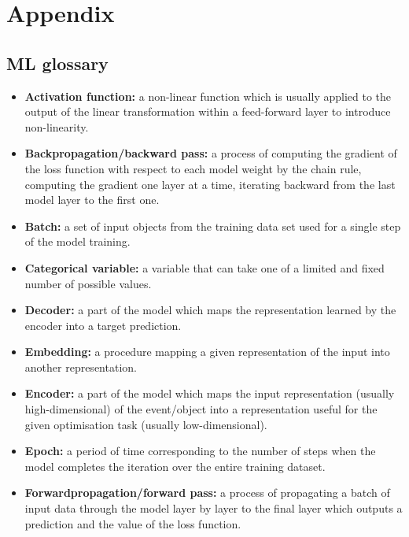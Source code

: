 \chapter{Appendix}

\section{ML glossary}\label{app:glossary}
\begin{itemize}
	
	\item[] \textbf{Activation function:} a non-linear function which is usually applied to the output of the linear transformation within a feed-forward layer to introduce non-linearity.   

	\item[] \textbf{Backpropagation/backward pass:} a process of computing the gradient of the loss function with respect to each model weight by the chain rule, computing the gradient one layer at a time, iterating backward from the last model layer to the first one. 

	\item[] \textbf{Batch:} a set of input objects from the training data set used for a single step of the model training.

	\item[] \textbf{Categorical variable:} a variable that can take one of a limited and fixed number of possible values.

	\item[] \textbf{Decoder:} a part of the model which maps the representation learned by the encoder into a target prediction. 

	\item[] \textbf{Embedding:} a procedure mapping a given representation of the input into another representation. 
	
	\item[] \textbf{Encoder:} a part of the model which maps the input representation (usually high-dimensional) of the event/object into a representation useful for the given optimisation task (usually low-dimensional).

    \item[] \textbf{Epoch:} a period of time corresponding to the number of steps when the model completes the iteration over the entire training dataset.  

	\item[] \textbf{Forwardpropagation/forward pass:}  a process of propagating a batch of input data through the model layer by layer to the final layer which outputs a prediction and the value of the loss function.


\end{itemize}
